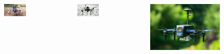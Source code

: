 \documentclass[aspectratio=169]{beamer}
\begin{document}
\begin{frame}
\begin{columns}[c]
    \vspace{-1em}

    \begin{figure}
      \centering
      \includegraphics[width=1.0\textwidth]{./fig/uavs/f550_real.jpg}
    \end{figure}


    \begin{figure}
      \centering
      \includegraphics[width=1.0\textwidth]{./fig/uavs/x500_real.jpg}
    \end{figure}

    \vspace{-1em}

    \begin{figure}
      \centering
      \includegraphics[width=1.0\textwidth]{./fig/uavs/ecodrone.jpg}
    \end{figure}


\end{columns}
\end{frame}
\end{document}
